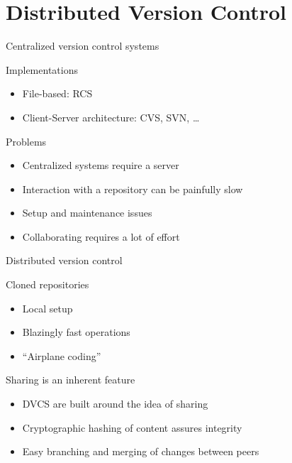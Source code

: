 \documentclass[18pt,mathserif]{beamer}
\begin{document}
\section{Distributed Version Control}

\begin{frame}{Centralized version control systems}
  \begin{block}{Implementations}
    \begin{itemize}
      \item File-based: RCS
      \item Client-Server architecture: CVS, SVN, \ldots
    \end{itemize}
  \end{block}

  \pause

  \begin{block}{Problems}
    \begin{itemize}
      \item Centralized systems require a server
      \item Interaction with a repository can be painfully slow
      \item Setup and maintenance issues
      \item Collaborating requires a lot of effort
    \end{itemize}
  \end{block}
\end{frame}
\begin{frame}{Distributed version control}
  \begin{block}{Cloned repositories}
    \begin{itemize}
      \item Local setup
      \item Blazingly fast operations
      \item \enquote{Airplane coding}
    \end{itemize}
  \end{block}
  \begin{block}{Sharing is an inherent feature}
    \begin{itemize}
      \item DVCS are built around the idea of sharing
      \item Cryptographic hashing of content assures integrity
      \item Easy branching and merging of changes between peers
    \end{itemize}
  \end{block}
\end{frame}
\end{document}

